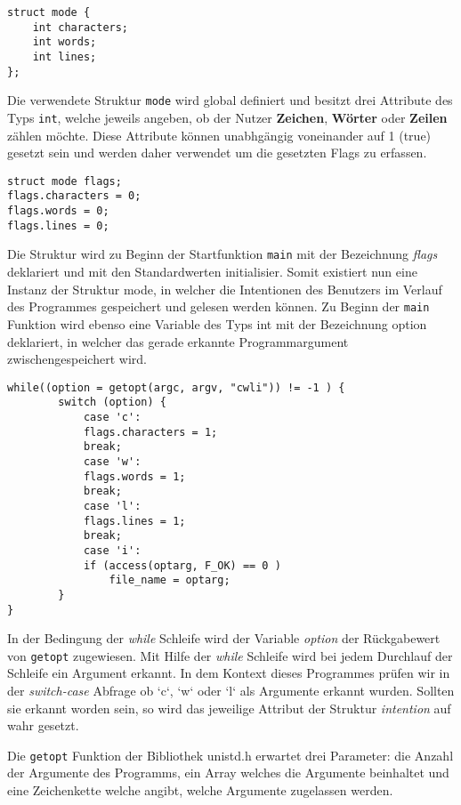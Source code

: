 \documentclass[10pt,a4paper]{article}
\begin{document}
\begin{spacing}{1}
\begin{lstlisting}
struct mode {
    int characters;
    int words;
    int lines;  
};
\end{lstlisting}

Die verwendete Struktur \texttt{mode} wird global definiert und besitzt drei Attribute des Typs \texttt{int}, welche jeweils angeben, ob der Nutzer \textbf{Zeichen}, \textbf{Wörter} oder \textbf{Zeilen} zählen möchte. Diese Attribute können unabhgängig voneinander auf 1 (true) gesetzt sein und werden daher verwendet um die gesetzten Flags zu erfassen.

\begin{lstlisting}
struct mode flags;
flags.characters = 0;
flags.words = 0;
flags.lines = 0;
\end{lstlisting}

Die Struktur wird zu Beginn der Startfunktion \texttt{main} mit der Bezeichnung {\it flags\/} deklariert und mit den Standardwerten initialisier. Somit existiert nun eine Instanz der Struktur mode, in welcher die Intentionen des Benutzers im Verlauf des Programmes gespeichert und gelesen werden können.  
Zu Beginn der \texttt{main} Funktion wird ebenso eine Variable des Typs int mit der Bezeichnung option deklariert, in welcher das gerade erkannte Programmargument zwischengespeichert wird. 

\begin{lstlisting}[style=CStyle]
while((option = getopt(argc, argv, "cwli")) != -1 ) {
        switch (option) {
            case 'c':
            flags.characters = 1; 
            break;
            case 'w':
            flags.words = 1; 
            break;
            case 'l':
            flags.lines = 1;
            break;
            case 'i':
            if (access(optarg, F_OK) == 0 )
                file_name = optarg;
        }
}
\end{lstlisting}

In der Bedingung der {\it while\/} Schleife wird der Variable {\it option\/} der Rückgabewert von \texttt{getopt} zugewiesen. Mit Hilfe der {\it while\/} Schleife wird bei jedem Durchlauf der Schleife ein Argument erkannt. In dem Kontext dieses Programmes prüfen wir in der {\it switch-case\/}  Abfrage ob `c`, `w` oder `l` als Argumente erkannt wurden. Sollten sie erkannt worden sein, so wird das jeweilige Attribut der Struktur {\it intention\/} auf wahr gesetzt.

Die \texttt{getopt} Funktion der Bibliothek unistd.h erwartet drei Parameter: die Anzahl der Argumente des Programms, ein Array welches die Argumente beinhaltet und eine Zeichenkette welche angibt, welche Argumente zugelassen werden.


\end{spacing}
\end{document}
